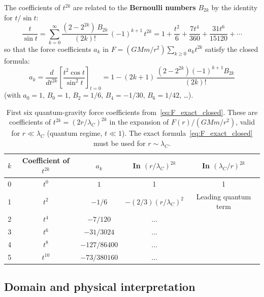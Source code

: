 \documentclass[11pt,a4paper]{article}
\theoremstyle{definition}
\theoremstyle{remark}
\begin{document}
	The coefficients of $t^{2k}$ are related to the \textbf{Bernoulli numbers}
	$B_{2k}$ by the identity for $t/\sin t$:
	\begin{equation}
		\frac{t}{\sin t} = \sum_{k=0}^{\infty}
		  \frac{(2-2^{2k})\,B_{2k}}{(2k)!}\,(-1)^{k+1}\,t^{2k}
		= 1 + \frac{t^2}{6} + \frac{7t^4}{360} + \frac{31t^6}{15120} + \cdots
	\end{equation}
	so that the force coefficients $a_k$ in $F = (GMm/r^2)\sum_{k\geq0}a_k t^{2k}$
	satisfy the closed formula:
	\begin{equation}
		\boxed{a_k = \frac{d}{dt^{2k}}\!\left[\frac{t^2\cos t}{\sin^2 t}\right]_{t=0}
		     = 1 - (2k+1)\,\frac{(2-2^{2k})(-1)^{k+1}B_{2k}}{(2k)!}}
		\label{eq:a_k_closed}
	\end{equation}
	(with $a_0=1$, $B_0=1$, $B_2=1/6$, $B_4=-1/30$, $B_6=1/42$, \ldots).

	\begin{table}[h]
	\centering
	\renewcommand{\arraystretch}{1.3}
	\caption{First six quantum-gravity force coefficients from~\eqref{eq:F_exact_closed}.
	  These are coefficients of $t^{2k} = (2r/\lambda_C)^{2k}$ in the expansion of
	  $F(r)/(GMm/r^2)$, valid for $r \ll \lambda_C$ (quantum regime, $t\ll1$).
	  The exact formula~\eqref{eq:F_exact_closed} must be used for $r \sim \lambda_C$.}
	\begin{tabular}{@{}ccccc@{}}
	\toprule
	$k$ & Coefficient of $t^{2k}$ & $a_k$ & In $(r/\lambda_C)^{2k}$ & In $(\lambda_C/r)^{2k}$ \\
	\midrule
	0 & $t^0$  & $1$         & 1  & 1 \\
	1 & $t^2$  & $-1/6$      & $-(2/3)(r/\lambda_C)^2$ & Leading quantum term \\
	2 & $t^4$  & $-7/120$    & ...   &   \\
	3 & $t^6$  & $-31/3024$  & ...   &   \\
	4 & $t^8$  & $-127/86400$& ...   &   \\
	5 & $t^{10}$&$-73/380160$& ...   &   \\
	\bottomrule
	\end{tabular}
	\end{table}

	\subsection{Domain and physical interpretation}
\end{document}
